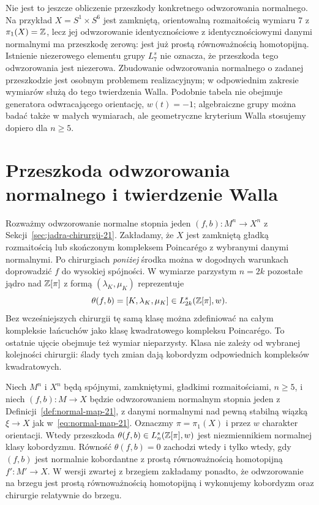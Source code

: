 Nie jest to jeszcze obliczenie przeszkody
konkretnego odwzorowania normalnego. Na przykład
$X=S^1\times S^6$ jest zamkniętą,
orientowalną rozmaitością wymiaru $7$
z $\pi_1(X)=\mathbb{Z}$, lecz jej odwzorowanie identycznościowe
z identycznościowymi danymi normalnymi ma
przeszkodę zerową: jest już prostą
równoważnością homotopijną.
Istnienie niezerowego elementu grupy $L_7^s$
nie oznacza, że przeszkoda tego odwzorowania jest niezerowa.
Zbudowanie odwzorowania normalnego o zadanej przeszkodzie
jest osobnym problemem realizacyjnym; w odpowiednim
zakresie wymiarów służą do tego twierdzenia Walla.
Podobnie tabela nie obejmuje generatora
odwracającego orientację, $w(t)=-1$;
algebraiczne grupy można badać także w małych
wymiarach, ale geometryczne kryterium Walla
stosujemy dopiero dla $n\geq5$.

\section{Przeszkoda odwzorowania normalnego i twierdzenie Walla}
\label{sec:tw-Walla-22}

Rozważmy odwzorowanie normalne stopnia jeden
$(f,b):M^n\to X^n$ z
Sekcji~\ref{sec:jadra-chirurgii-21}.
Zakładamy, że $X$ jest zamkniętą gładką
rozmaitością lub skończonym kompleksem
Poincarégo z wybranymi danymi normalnymi.
Po chirurgiach \emph{poniżej} środka można
w dogodnych warunkach doprowadzić $f$ do
wysokiej spójności. W wymiarze parzystym
$n=2k$ pozostałe jądro nad $\mathbb{Z}[\pi]$
z formą $(\lambda_K,\mu_K)$ reprezentuje
\[
 \theta(f,b)=[K,\lambda_K,\mu_K]
       \in L^s_{2k}(\mathbb{Z}[\pi],w).
\]
Bez wcześniejszych chirurgii tę samą klasę
można zdefiniować na całym kompleksie łańcuchów
jako klasę kwadratowego kompleksu Poincarégo.
To ostatnie ujęcie obejmuje też wymiar nieparzysty.
Klasa nie zależy od wybranej kolejności
chirurgii: ślady tych zmian dają kobordyzm
odpowiednich kompleksów kwadratowych.

\begin{twierdzenie}
\label{thm:Wall-L-22}
Niech $M^n$ i $X^n$ będą spójnymi, zamkniętymi,
gładkimi rozmaitościami, $n\geq5$, i niech
$(f,b):M\to X$ będzie odwzorowaniem normalnym
stopnia jeden z Definicji~\ref{def:normal-map-21},
z danymi normalnymi nad pewną stabilną wiązką
$\xi\to X$ jak w~\eqref{eq:normal-map-21}.
Oznaczmy $\pi=\pi_1(X)$ i przez $w$ charakter
orientacji. Wtedy przeszkoda
$\theta(f,b)\in L^s_n(\mathbb{Z}[\pi],w)$ jest niezmiennikiem
normalnej klasy kobordyzmu.
Równość $\theta(f,b)=0$ zachodzi wtedy i tylko wtedy,
gdy $(f,b)$ jest normalnie kobordantne z prostą
równoważnością homotopijną $f':M'\to X$.
W wersji zwartej z brzegiem zakładamy ponadto,
że odwzorowanie na brzegu jest prostą równoważnością
homotopijną i wykonujemy kobordyzm oraz chirurgie
relatywnie do brzegu.
\end{twierdzenie}

